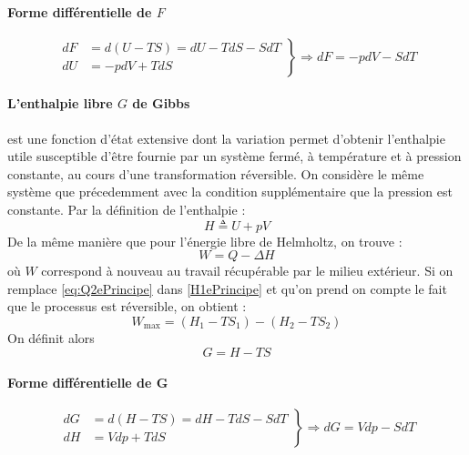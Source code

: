 \paragraph{Forme différentielle de $F$}
\begin{equation} \left.\begin{array}{ll} dF &= d(U-TS) = dU - TdS - SdT \\ dU &= -pdV + TdS \end{array}\right\} \Rightarrow dF = -pdV - SdT\end{equation}

\paragraph{L'enthalpie libre $G$ de Gibbs} est une fonction d'état extensive dont la variation permet d'obtenir l'enthalpie utile susceptible d'être fournie par un système fermé, à température et à pression constante, au cours d'une transformation réversible. On considère le même système que précedemment avec la condition supplémentaire que la pression est constante. Par la définition de l'enthalpie :
\begin{equation} H \triangleq U + pV\end{equation}
De la même manière que pour l'énergie libre de Helmholtz, on trouve :
\begin{equation} W = Q - \Delta H \label{H1ePrincipe}\end{equation}
où $W$ correspond à nouveau au travail récupérable par le milieu extérieur. Si on remplace \ref{eq:Q2ePrincipe} dans \ref{H1ePrincipe} et qu'on prend on compte le fait que le processus est réversible, on obtient :
\begin{equation} W_\text{max} = (H_1 - TS_1) - (H_2 - TS_2) \end{equation}
On définit alors
\begin{equation} G = H - TS \end{equation}

\paragraph{Forme différentielle de G}
\begin{equation} \left.\begin{array}{ll} dG &= d(H-TS) = dH - TdS - SdT \\ dH &= Vdp + TdS \end{array}\right\} \Rightarrow dG = Vdp - SdT \label{eq:gibbs-duhem}\end{equation}

